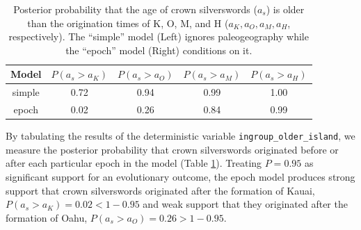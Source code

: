 \begin{table}[!h]
\centering
\begin{tabular}{c|cccc}
Model       & $P(a_s>a_K)$ & $P(a_s>a_O)$ & $P(a_s>a_M)$ & $P(a_s>a_H)$ \\ \hline
simple & 0.72 & 0.94 & 0.99 & 1.00 \\
epoch & 0.02 & 0.26 & 0.84 & 0.99 \\
\end{tabular}
\caption{Posterior probability that the age of crown silverswords ($a_s$) is older than the origination times of K, O, M, and H ($a_K, a_O, a_M, a_H$, respectively). The ``simple'' model (Left) ignores paleogeography while the ``epoch'' model (Right) conditions on it.}
\label{tab:epoch_ages}
\end{table}

By tabulating the results of the deterministic variable {\tt ingroup\_older\_island}, we measure the posterior probability that crown silverswords originated before or after each particular epoch in the model (Table \ref{tab:epoch_ages}).
Treating $P=0.95$ as significant support for an evolutionary outcome, the epoch model produces strong support that crown silverswords originated after the formation of Kauai, $P(a_s > a_K) = 0.02 < 1-0.95$ and weak support that they originated after the formation of Oahu, $P(a_s > a_O) = 0.26 > 1-0.95$.


\newpage
